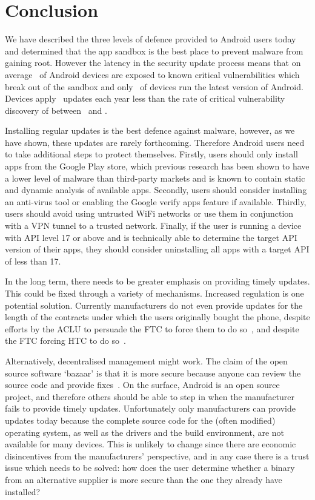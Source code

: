 \documentclass{llncs}
\begin{document}
\section{Conclusion}
\label{sec:conclusion}
We have described the three levels of defence provided to Android users today and determined that the app sandbox is the best place to prevent malware from gaining root.
However the latency in the security update process means that on average \daMeanInsecurityPerc\ of Android devices are exposed to known critical vulnerabilities which break out of the sandbox and only \daUpdatednessPerc\ of devices run the latest version of Android.
Devices apply \daUpdatesPerYear\ updates each year less than the rate of critical vulnerability discovery of between \avoVulnsPerYearAllAndroid\ and \avoVulnsPerYear.

Installing regular updates is the best defence against malware, however, as we have shown, these updates are rarely forthcoming. 
Therefore Android users need to take additional steps to protect themselves. 
Firstly, users should only install apps from the Google Play store, which previous research has been shown to have a lower level of malware than third-party markets and is known to contain static and dynamic analysis of available apps.
Secondly, users should consider installing an anti-virus tool or enabling the Google verify apps feature if available. 
Thirdly, users should avoid using untrusted WiFi networks or use them in conjunction with a VPN tunnel to a trusted network. 
Finally, if the user is running a device with API level 17 or above and is technically able to determine the target API version of their apps, they should consider uninstalling all apps with a target API of less than 17.

In the long term, there needs to be greater emphasis on providing timely updates.
This could be fixed through a variety of mechanisms.
Increased regulation is one potential solution.
Currently manufacturers do not even provide updates for the length of the contracts under which the users originally bought the phone, despite efforts by the ACLU to persuade the FTC to force them to do so~\cite{Soghoian2013}, and despite the FTC forcing HTC to do so~\cite{FTCHTC2013}.

Alternatively, decentralised management might work.
The claim of the open source software `bazaar' is that it is more secure because anyone can review the source code and provide fixes~\cite{Raymond1999}.
On the surface, Android is an open source project, and therefore others should be able to step in when the manufacturer fails to provide timely updates.
Unfortunately only manufacturers can provide updates today because the complete source code for the (often modified) operating system, as well as the drivers and the build environment, are not available for many devices.
This is unlikely to change since there are economic disincentives from the manufacturers' perspective, and in any case there is a trust issue which needs to be solved: how does the user determine whether a binary from an alternative supplier is more secure than the one they already have installed?
\end{document}
